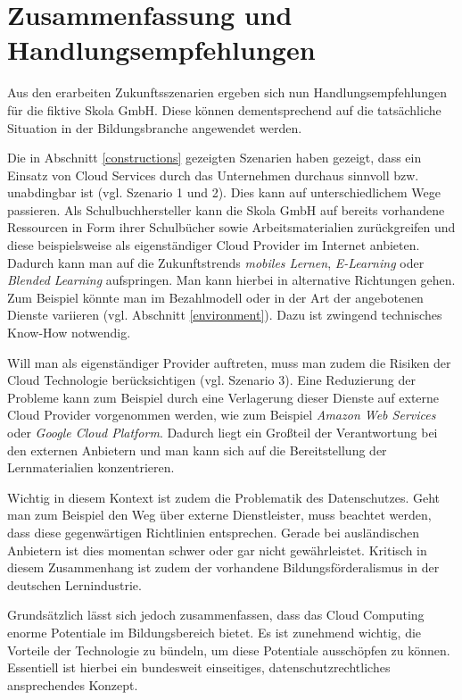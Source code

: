 \section{Zusammenfassung und Handlungsempfehlungen}
\label{conclusion}
Aus den erarbeiten Zukunftsszenarien ergeben sich nun Handlungsempfehlungen für die fiktive Skola GmbH. Diese können dementsprechend auf die tatsächliche Situation in der Bildungsbranche angewendet werden.

Die in Abschnitt \ref{constructions} gezeigten Szenarien haben gezeigt, dass ein Einsatz von Cloud Services durch das Unternehmen durchaus sinnvoll bzw. unabdingbar ist (vgl. Szenario 1 und 2). Dies kann auf unterschiedlichem Wege passieren. Als Schulbuchhersteller kann die Skola GmbH auf bereits vorhandene Ressourcen in Form ihrer Schulbücher sowie Arbeitsmaterialien zurückgreifen und diese beispielsweise als eigenständiger Cloud Provider im Internet anbieten. Dadurch kann man auf die Zukunftstrends \textit{mobiles Lernen}, \textit{E-Learning} oder \textit{Blended Learning} aufspringen. Man kann hierbei in alternative Richtungen gehen. Zum Beispiel könnte man im Bezahlmodell oder in der Art der angebotenen Dienste variieren (vgl. Abschnitt \ref{environment}). Dazu ist zwingend technisches Know-How notwendig. 

Will man als eigenständiger Provider auftreten, muss man zudem die Risiken der Cloud Technologie berücksichtigen (vgl. Szenario 3). Eine Reduzierung der Probleme kann zum Beispiel durch eine Verlagerung dieser Dienste auf externe Cloud Provider vorgenommen werden, wie zum Beispiel \textit{Amazon Web Services} oder \textit{Google Cloud Platform}. Dadurch liegt ein Großteil der Verantwortung bei den externen Anbietern und man kann sich auf die Bereitstellung der Lernmaterialien konzentrieren.

Wichtig in diesem Kontext ist zudem die Problematik des Datenschutzes. Geht man zum Beispiel den Weg über externe Dienstleister, muss beachtet werden, dass diese gegenwärtigen Richtlinien entsprechen. Gerade bei ausländischen Anbietern ist dies momentan schwer oder gar nicht gewährleistet. Kritisch in diesem Zusammenhang ist zudem der vorhandene Bildungsförderalismus in der deutschen Lernindustrie.

Grundsätzlich lässt sich jedoch zusammenfassen, dass das Cloud Computing enorme Potentiale im Bildungsbereich bietet. Es ist zunehmend wichtig, die Vorteile der Technologie zu bündeln, um diese Potentiale ausschöpfen zu können. Essentiell ist hierbei ein bundesweit einseitiges, datenschutzrechtliches ansprechendes Konzept.